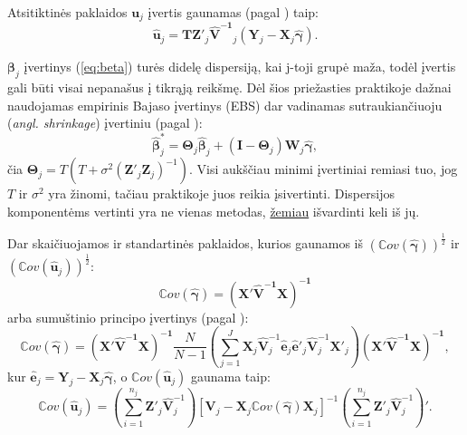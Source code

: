 \documentclass[12pt,a4paper]{article}
\begin{document}
Atsitiktinės paklaidos $\mathbf{u}_j$ įvertis gaunamas (pagal \cite{EBi}) taip:
\begin{equation}
\mathbf{\hat{u}}_j=\mathbf{TZ}'_j\mathbf{\hat{V}^{-1}}_j\left(\mathbf{Y}_j-\mathbf{X}_j\boldsymbol{\hat{\gamma}}\right).
\end{equation}

$\boldsymbol{\beta}_j$ įvertinys (\ref{eq:beta}) turės didelę dispersiją, kai j-toji grupė maža, todėl įvertis gali būti visai nepanašus į tikrąją reikšmę. Dėl šios priežasties praktikoje dažnai naudojamas empirinis Bajaso įvertinys (EBS) dar vadinamas sutraukiančiuoju (\textit{angl. shrinkage}) įvertiniu (pagal \cite{shrinkage}):
\begin{equation}
\boldsymbol{\hat{\beta}}^*_{j}=\boldsymbol{\Theta}_j\boldsymbol{\hat{\beta}}_j+(\boldsymbol{I} - \boldsymbol{\Theta}_j)\mathbf{W}_j\boldsymbol{\hat{\gamma}},
\end{equation}
čia $\mathbf{\Theta}_j=T\left(T+\sigma^2(\mathbf{Z}'_j\mathbf{Z}_j)^{-1}\right)$. Visi aukščiau minimi įvertiniai remiasi tuo, jog $T$ ir $\sigma^2$ yra žinomi, tačiau praktikoje juos reikia įsivertinti. Dispersijos komponentėms vertinti yra ne vienas metodas, \hyperlink{reml}{žemiau} išvardinti keli iš jų.

\indent Dar skaičiuojamos ir standartinės paklaidos, kurios gaunamos iš $(\mathbb{C}ov(\boldsymbol{\hat{\gamma}}))^{\frac{1}{2}}$ ir $(\mathbb{C}ov(\mathbf{\hat{u}}_j))^{\frac{1}{2}}$:
\begin{equation}
\mathbb{C}ov(\boldsymbol{\hat{\gamma}})=\mathbf{(X'\hat{V}^{-1}X)^{-1}}
\end{equation}
arba sumuštinio principo įvertinys (pagal \cite{sandwich}):
\begin{equation}
\mathbb{C}ov(\boldsymbol{\hat{\gamma}})=\mathbf{(X'\hat{V}^{-1}X)^{-1}}\frac{N}{N-1}\left(\sum^J_{j=1}\mathbf{X}_j\mathbf{\hat{V}}^{-1}_j\mathbf{\hat{e}}_j\mathbf{\hat{e}}'_j \mathbf{\hat{V}}^{-1}_j\mathbf{X}'_j\right)\mathbf{(X'\hat{V}^{-1}X)^{-1}},
\end{equation}
kur $\mathbf{\hat{e}}_j=\mathbf{Y}_j-\mathbf{X}_j\boldsymbol{\hat{\gamma}}$, o $\mathbb{C}ov(\mathbf{\hat{u}}_j)$ gaunama taip:
\begin{equation}
\mathbb{C}ov(\mathbf{\hat{u}}_j)=\left(\sum^{n_j}_{i=1}\mathbf{Z}'_j\mathbf{\hat{V}}^{-1}_j\right) \left[\mathbf{V}_j-\mathbf{X}_j\mathbb{C}ov(\boldsymbol{\hat{\gamma}})\mathbf{X}_j\right]^{-1} \left(\sum^{n_j}_{i=1}\mathbf{Z}'_j\mathbf{\hat{V}}^{-1}_j\right)'.
\end{equation}
\end{document}

